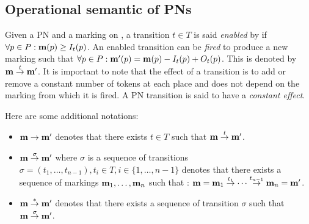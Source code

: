
\subsection{Operational semantic of \aclp{PN}}

Given a \ac{PN} \NPT and a marking \marq on \tupleN, a transition $t \in T$ is said \emph{enabled} by \marq if $\forall p \in P : \mathbf{m}(p) \geq I_t(p)$. An enabled transition can be \emph{fired} to produce a new marking \marqp such that $\forall p \in P : \mathbf{m'}(p) = \mathbf{m}(p) - I_t(p) + O_t(p)$. This is denoted by $\mathbf{m} \stackrel{t}{\to} \mathbf{m'}$.
It is important to note that the effect of a transition is to add or remove a constant number of tokens at each place and does not depend on the marking from which it is fired. A \ac{PN} transition is said to have a \emph{constant effect}.

Here are some additional notations:
\begin{itemize}
  \item $\mathbf{m} \rightarrow \mathbf{m'}$ denotes that there exists $t \in T$ such that $\mathbf{m} \stackrel{t}{\to} \mathbf{m'}$.
  \item $\mathbf{m} \stackrel{\sigma}{\to} \mathbf{m'}$ where $\sigma$ is a sequence of transitions $\sigma = (t_1, \dots, t_{n-1}), t_i \in T, i \in \{1, \dots, n-1\}$ denotes that there exists a sequence of markings $\mathbf{m}_1, \dots, \mathbf{m}_n$ such that : $\mathbf{m} = \mathbf{m}_1 \stackrel{t_1}{\to} \cdots \stackrel{t_{n-1}}{\to} \mathbf{m}_n = \mathbf{m'}$.
  \item $\mathbf{m} \stackrel{*}{\to} \mathbf{m'}$ denotes that there exists a sequence of transition $\sigma$ such that $\mathbf{m} \stackrel{\sigma}{\to} \mathbf{m'}$.
\end{itemize}

